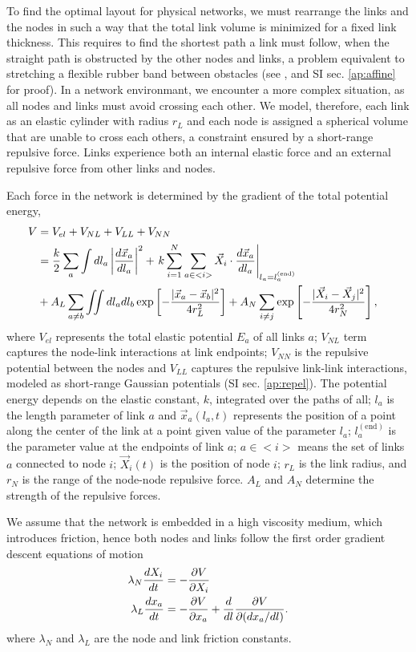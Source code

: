 \documentclass[nofootinbib,preprint,floatfix,titlepage,endfloats]{revtex4} %
\begin{document}
To find the optimal layout for physical networks, we must rearrange the links and the nodes in such a way that the total link volume is minimized for a fixed link thickness. This requires to find the shortest path a link must follow, when the straight path is obstructed by the other nodes and links, a problem equivalent to stretching a flexible rubber band between obstacles (see \cite{novikov1984}, and SI sec. \ref{ap:affine} for proof).
In a network environmant, we encounter a more complex situation, as all nodes and links must avoid crossing each other.
We model, therefore, each link as an elastic cylinder with radius $r_L$ and 
each node is assigned a spherical volume that are unable to cross each others, a constraint ensured by a short-range repulsive force.  
Links experience both an internal elastic force and an external repulsive force from other links and nodes. 

Each force in the network is determined by the gradient of the total potential energy,  
\begin{align}
    V &= V_{el} + V_{NL} + V_{LL} +V_{NN} \cr 
    &= {k\over 2}\sum_a\int dl_a \left|{d\vec{x}_a\over dl_a} \right|^2 + 
    \left. k\sum_{i=1}^N  \sum_{a\in <i>}  \vec{X}_i \cdot{d\vec{x}_a%
    \over dl_a}\right|_{l_a = l^{(\mathrm{end})}_a}
    \cr
    &+A_L\sum_{a\ne b} \iint dl_adl_b 
    \exp\left[- {|\vec{x}_a-\vec{x}_b|^2 \over 4 r_L^2}\right] + A_N\sum_{i\ne j}  \exp\left[- {|\vec{X}_i-\vec{X}_j|^2 \over 4r_N^2}\right],
 \label{eq:Vfull}
\end{align}
where $V_{el}$ represents the total elastic potential $E_a$ of all links $a$; $V_{NL}$ term
captures the node-link interactions at link endpoints;
 $V_{NN}$  is the repulsive potential between the nodes and  $V_{LL}$ captures the repulsive link-link interactions, modeled as short-range Gaussian potentials (SI sec. \ref{ap:repel}). 
The potential energy depends on the elastic constant, $k$, integrated over the paths of all; $l_a$ is the length parameter of link $a$ and  $\vec{x}_a(l_a,t)$ represents the position of a point along the center of the link at a point given value of the parameter $l_a$; $l_a^\mathrm{(end)}$ is the parameter value at the endpoints of link $a$; $a\in <i>$ means the set of links $a$ connected to node $i$; $\vec{X}_i(t)$ is the position of node $i$; $r_L$ is the link radius, and $r_N$ is the range of the node-node repulsive force. $A_L$ and $A_N$ determine the strength of the repulsive forces.   

We assume that the network is embedded in a high viscosity medium, which introduces friction, hence both nodes and links follow the first order gradient descent equations of motion  
\begin{align}
    \lambda_N {dX_i\over dt} &= -{\ro V \over \ro X_i} %
    \label{eq:nodes}\\
    \lambda_L {dx_a \over dt} & =  -{\ro V \over \ro x_a} + {d\over dl} {\ro V \over \ro (dx_a /dl)}   \label{eq:Langevin0}.
\end{align}
where $\lambda_N$ and $\lambda_L$ are the node and link friction constants. 
\end{document}
